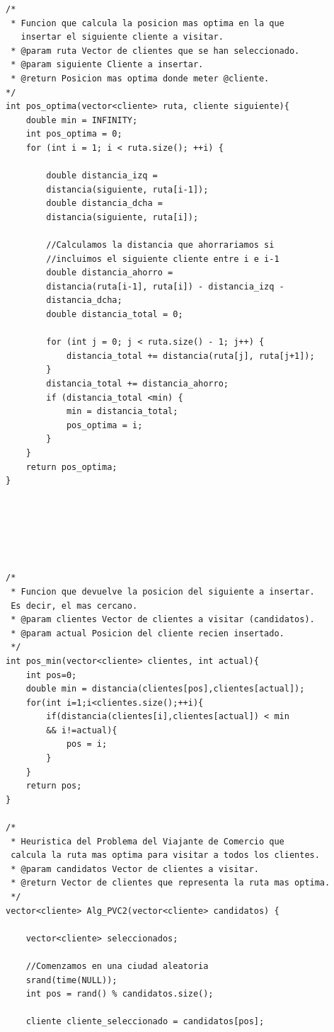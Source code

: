 \documentclass[a4paper,12pt,twoside]{article} %
\begin{document}
\lstset{language=C++}
\begin{lstlisting}
/*
 * Funcion que calcula la posicion mas optima en la que
   insertar el siguiente cliente a visitar.
 * @param ruta Vector de clientes que se han seleccionado.
 * @param siguiente Cliente a insertar.
 * @return Posicion mas optima donde meter @cliente.
*/
int pos_optima(vector<cliente> ruta, cliente siguiente){
    double min = INFINITY;
    int pos_optima = 0;
    for (int i = 1; i < ruta.size(); ++i) {

        double distancia_izq = 
        distancia(siguiente, ruta[i-1]);
        double distancia_dcha = 
        distancia(siguiente, ruta[i]);

        //Calculamos la distancia que ahorrariamos si
        //incluimos el siguiente cliente entre i e i-1
        double distancia_ahorro = 
        distancia(ruta[i-1], ruta[i]) - distancia_izq -
        distancia_dcha;
        double distancia_total = 0;

        for (int j = 0; j < ruta.size() - 1; j++) {
            distancia_total += distancia(ruta[j], ruta[j+1]);
        }
        distancia_total += distancia_ahorro;
        if (distancia_total <min) {
            min = distancia_total;
            pos_optima = i;
        }
    }
    return pos_optima;
}






/*
 * Funcion que devuelve la posicion del siguiente a insertar. 
 Es decir, el mas cercano.
 * @param clientes Vector de clientes a visitar (candidatos).
 * @param actual Posicion del cliente recien insertado.
 */
int pos_min(vector<cliente> clientes, int actual){
    int pos=0;
    double min = distancia(clientes[pos],clientes[actual]);
    for(int i=1;i<clientes.size();++i){
        if(distancia(clientes[i],clientes[actual]) < min 
        && i!=actual){
            pos = i;
        }
    }
    return pos;
}

/*
 * Heuristica del Problema del Viajante de Comercio que 
 calcula la ruta mas optima para visitar a todos los clientes.
 * @param candidatos Vector de clientes a visitar.
 * @return Vector de clientes que representa la ruta mas optima.
 */
vector<cliente> Alg_PVC2(vector<cliente> candidatos) {

    vector<cliente> seleccionados;

    //Comenzamos en una ciudad aleatoria
    srand(time(NULL));
    int pos = rand() % candidatos.size();

    cliente cliente_seleccionado = candidatos[pos];


\end{lstlisting}
\end{document}
